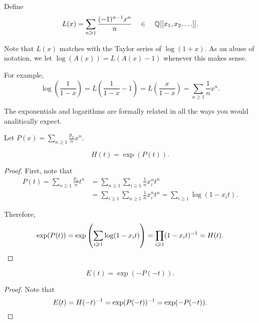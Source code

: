 \begin{definition}
	Define
	\begin{equation}
		L(x) = \sum_{n \geq 1} \frac{(-1)^{n-1}x^n}{n} \quad \in \quad \rationals[[x_1, x_2, \ldots]].
	\end{equation}
\end{definition}
Note that \(L(x)\) matches with the Taylor series of \(\log(1+x)\).
As an abuse of notation, we let \(\log(A(x)) = L(A(x) - 1)\) whenever this makes sense.

For example,
\begin{equation}
	\log\left( \frac{1}{1 - x} \right)
	= L\left( \frac{1}{1 - x} - 1 \right)
	= L\left( \frac{x}{1 - x} \right) 
	= \sum_{n \geq 1} \frac{1}{n} x^n.
\end{equation}

The exponentials and logarithms are formally related in all the ways you would analitically expect.

Let \(P(x) = \sum_{n \geq 1} \frac{p_n}{n} x^n\).

\begin{lemma} \label{lem:H-equals-exp-P}
	\begin{equation}
		H(t) = \exp(P(t)).
	\end{equation}
\end{lemma}

\begin{proof}
	First, note that
	\begin{align}
		P(t)
		= \sum_{n \geq 1} \frac{p_n}{n} t^n
		&= \sum_{n \geq 1} \sum_{i \geq 1} \frac{1}{n} x_i^n t^n\\
		&= \sum_{i \geq 1} \sum_{n \geq 1} \frac{1}{n} x_i^n t^n
		= \sum_{i \geq 1} \log(1 - x_it).
	\end{align}

	Therefore,
	\begin{equation}
		\exp(P(t))
		= \exp\left( \sum_{i \geq 1} \log(1 - x_it) \right)
		= \prod_{i \geq 1} (1 - x_it)^{-1}
		= H(t). \qedhere
	\end{equation}
\end{proof}

\begin{lemma} \label{lem:E-equals-mexp-mP}
	\begin{equation}
		E(t) = \exp(-P(-t)).
	\end{equation}	
\end{lemma}

\begin{proof}
	Note that
	\begin{equation}
		E(t) = H(-t)^{-1} = \exp(P(-t))^{-1} = \exp(-P(-t)). \qedhere
	\end{equation}	
\end{proof}

